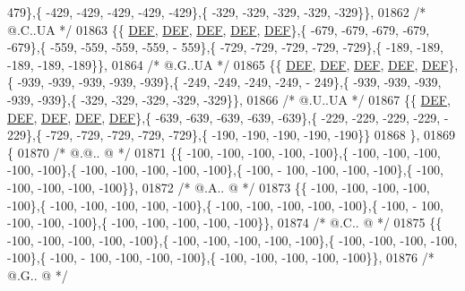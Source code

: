 \begin{DoxyCode}
      479\},\{ -429, -429, -429, -429, -429\},\{ -329, -329, -329, -329, -329\}\},
01862 \textcolor{comment}{/*  @.C..UA */}
01863 \{\{  \mbox{\hyperlink{1_88_84__epars_8h_a397419fc12b37ed479c8abb9d444d843}{DEF}},  \mbox{\hyperlink{1_88_84__epars_8h_a397419fc12b37ed479c8abb9d444d843}{DEF}},  \mbox{\hyperlink{1_88_84__epars_8h_a397419fc12b37ed479c8abb9d444d843}{DEF}},  \mbox{\hyperlink{1_88_84__epars_8h_a397419fc12b37ed479c8abb9d444d843}{DEF}},  \mbox{\hyperlink{1_88_84__epars_8h_a397419fc12b37ed479c8abb9d444d843}{DEF}}\},\{ -679, -679, -679, -679, -679\},\{ -559, -559, -559, -559, -
      559\},\{ -729, -729, -729, -729, -729\},\{ -189, -189, -189, -189, -189\}\},
01864 \textcolor{comment}{/*  @.G..UA */}
01865 \{\{  \mbox{\hyperlink{1_88_84__epars_8h_a397419fc12b37ed479c8abb9d444d843}{DEF}},  \mbox{\hyperlink{1_88_84__epars_8h_a397419fc12b37ed479c8abb9d444d843}{DEF}},  \mbox{\hyperlink{1_88_84__epars_8h_a397419fc12b37ed479c8abb9d444d843}{DEF}},  \mbox{\hyperlink{1_88_84__epars_8h_a397419fc12b37ed479c8abb9d444d843}{DEF}},  \mbox{\hyperlink{1_88_84__epars_8h_a397419fc12b37ed479c8abb9d444d843}{DEF}}\},\{ -939, -939, -939, -939, -939\},\{ -249, -249, -249, -249, -
      249\},\{ -939, -939, -939, -939, -939\},\{ -329, -329, -329, -329, -329\}\},
01866 \textcolor{comment}{/*  @.U..UA */}
01867 \{\{  \mbox{\hyperlink{1_88_84__epars_8h_a397419fc12b37ed479c8abb9d444d843}{DEF}},  \mbox{\hyperlink{1_88_84__epars_8h_a397419fc12b37ed479c8abb9d444d843}{DEF}},  \mbox{\hyperlink{1_88_84__epars_8h_a397419fc12b37ed479c8abb9d444d843}{DEF}},  \mbox{\hyperlink{1_88_84__epars_8h_a397419fc12b37ed479c8abb9d444d843}{DEF}},  \mbox{\hyperlink{1_88_84__epars_8h_a397419fc12b37ed479c8abb9d444d843}{DEF}}\},\{ -639, -639, -639, -639, -639\},\{ -229, -229, -229, -229, -
      229\},\{ -729, -729, -729, -729, -729\},\{ -190, -190, -190, -190, -190\}\}
01868 \},
01869 \{
01870 \textcolor{comment}{/*  @.@.. @ */}
01871 \{\{ -100, -100, -100, -100, -100\},\{ -100, -100, -100, -100, -100\},\{ -100, -100, -100, -100, -100\},\{ -100, -
      100, -100, -100, -100\},\{ -100, -100, -100, -100, -100\}\},
01872 \textcolor{comment}{/*  @.A.. @ */}
01873 \{\{ -100, -100, -100, -100, -100\},\{ -100, -100, -100, -100, -100\},\{ -100, -100, -100, -100, -100\},\{ -100, -
      100, -100, -100, -100\},\{ -100, -100, -100, -100, -100\}\},
01874 \textcolor{comment}{/*  @.C.. @ */}
01875 \{\{ -100, -100, -100, -100, -100\},\{ -100, -100, -100, -100, -100\},\{ -100, -100, -100, -100, -100\},\{ -100, -
      100, -100, -100, -100\},\{ -100, -100, -100, -100, -100\}\},
01876 \textcolor{comment}{/*  @.G.. @ */}

\end{DoxyCode}
